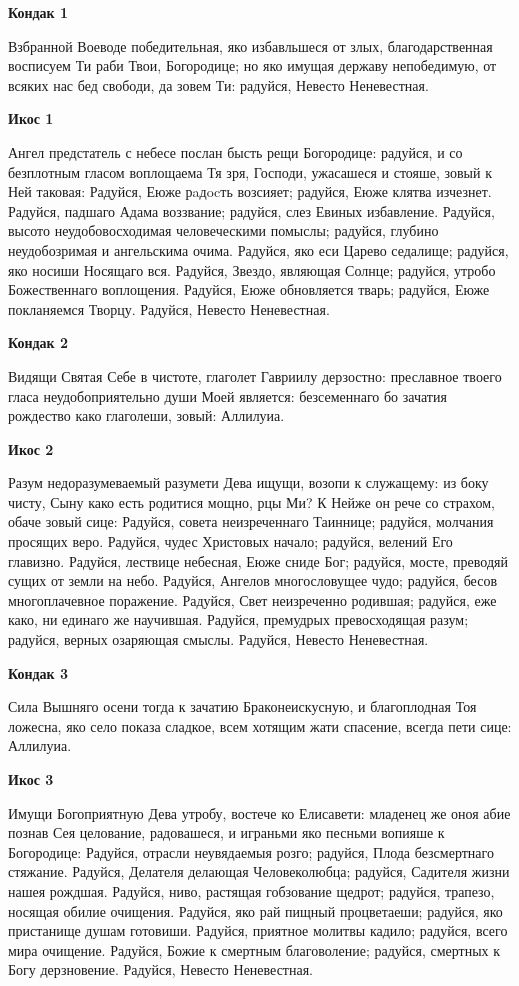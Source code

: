 \bfseries Кондак 1\normalfont{}

Взбранной Воеводе победительная, яко избавльшеся от злых, благодарственная восписуем Ти раби Твои, Богородице; но яко имущая державу непобедимую, от всяких нас бед свободи, да зовем Ти: радуйся, Невесто Неневестная.


\bfseries Икос 1\normalfont{}

Ангел предстатель с небесе послан бысть рещи Богородице: радуйся, и со безплотным гласом воплощаема Тя зря, Господи, ужасашеся и стояше, зовый к Ней таковая: Радуйся, Еюже рaдocть возсияет; радуйся, Еюже клятва изчезнет. Радуйся, падшаго Адама воззвание; радуйся, слез Евиных избавление. Радуйся, высото неудобовосходимая человеческими помыслы; радуйся, глубино неудобозримая и ангельскима очима. Радуйся, яко еси Царево седалище; радуйся, яко носиши Носящаго вся. Радуйся, Звездо, являющая Солнце; радуйся, утробо Божественнаго воплощения. Радуйся, Еюже обновляется тварь; радуйся, Еюже покланяемся Творцу. Радуйся, Невесто Неневестная.


\bfseries Кондак 2\normalfont{}

Видящи Святая Себе в чистоте, глаголет Гавриилу дерзостно: преславное твоего гласа неудобоприятельно души Моей является: безсеменнаго бо зачатия рождество како глаголеши, зовый: Аллилуиа.


\bfseries Икос 2\normalfont{}

Разум недоразумеваемый разумети Дева ищущи, возопи к служащему: из боку чисту, Сыну како есть родитися мощно, рцы Ми? К Нейже он рече со страхом, обаче зовый сице: Радуйся, совета неизреченнаго Таиннице; радуйся, молчания просящих веро. Радуйся, чудес Христовых начало; радуйся, велений Его главизно. Радуйся, лествице небесная, Еюже сниде Бог; радуйся, мосте, преводяй сущих от земли на небо. Радуйся, Ангелов многословущее чудо; радуйся, бесов многоплачевное поражение. Радуйся, Свет неизреченно родившая; радуйся, еже како, ни единаго же научившая. Радуйся, премудрых превосходящая разум; радуйся, верных озаряющая смыслы. Радуйся, Невесто Неневестная.


\bfseries Кондак 3\normalfont{}


Сила Вышняго осени тогда к зачатию Браконеискусную, и благоплодная Тоя ложесна, яко село показа сладкое, всем хотящим жати спасение, всегда пети сице: Аллилуиа.


\bfseries Икос 3\normalfont{}


Имущи Богоприятную Дева утробу, востече ко Елисавети: младенец же оноя абие познав Сея целование, радовашеся, и играньми яко песньми вопияше к Богородице: Радуйся, отрасли неувядаемыя розго; радуйся, Плода безсмертнаго стяжание. Радуйся, Делателя делающая Человеколюбца; радуйся, Садителя жизни нашея рождшая. Радуйся, ниво, растящая гобзование щедрот; радуйся, трапезо, носящая обилие очищения. Радуйся, яко рай пищный процветаеши; радуйся, яко пристанище душам готовиши. Радуйся, приятное молитвы кадило; радуйся, всего мира очищение. Радуйся, Божие к смертным благоволение; радуйся, смертных к Богу дерзновение. Радуйся, Невесто Неневестная.



